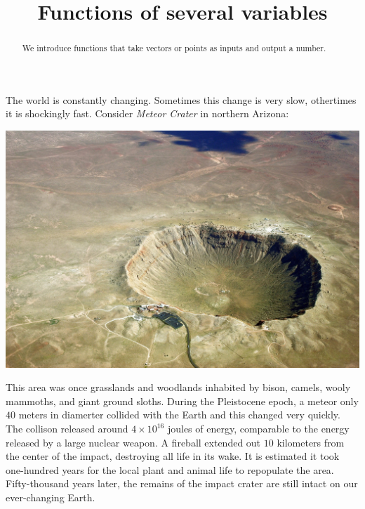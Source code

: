 \documentclass{ximera}
\title[Dig-In:]{Functions of several variables}
\begin{document}
\begin{abstract}
  We introduce functions that take vectors or points as inputs and
  output a number.
\end{abstract}
\maketitle


The world is constantly changing. Sometimes this change is very slow,
othertimes it is shockingly fast. Consider \textit{Meteor Crater} in
northern Arizona:
\begin{image}[3in]
  \includegraphics{meteorcrater.jpg}
\end{image}
This area was once grasslands and woodlands inhabited by bison,
camels, wooly mammoths, and giant ground sloths. During the
Pleistocene epoch, a meteor only $40$ meters in diamerter collided
with the Earth and this changed very quickly. The collison released
around $4\times10^{16}$ joules of energy, comparable to the energy
released by a large nuclear weapon. A fireball extended out $10$
kilometers from the center of the impact, destroying all life in its
wake. It is estimated it took one-hundred years for the local plant
and animal life to repopulate the area.  Fifty-thousand years later,
the remains of the impact crater are still intact on our ever-changing
Earth.
\end{document}
